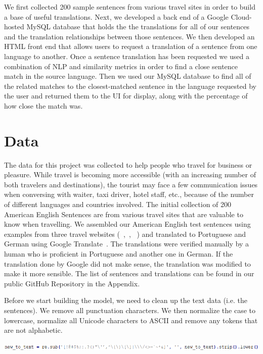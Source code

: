 \documentclass[runningheads]{llncs}
\begin{document}
	
	We first collected 200 sample sentences from various travel sites in order to build a base of useful translations. Next, we developed a back end of a Google Cloud-hosted MySQL database that holds the the translations for all of our sentences and the translation relationships between those sentences. We then developed an HTML front end that allows users to request a translation of a sentence from one language to another. Once a sentence translation has been requested we used a combination of NLP and similarity metrics in order to find a close sentence match in the source language. Then we used our MySQL database to find all of the related matches to the closest-matched sentence in the language requested by the user and returned them to the UI for display, along with the percentage of how close the match was. 

	\section{Data}
	The data for this project was collected to help people who travel for business or pleasure.  While travel is becoming more accessible (with an increasing number of both travelers and destinations), the tourist may face a few communication issues when conversing with waiter, taxi driver, hotel staff, etc., because of the number of different languages and countries involved. The initial collection of 200 American English Sentences are from various travel sites that are valuable to know when travelling. We assembled our American English test sentences using examples from three travel websites (~\cite{ref_url9},~\cite{ref_url4},~\cite{ref_url10} ) and translated to Portuguese and German using Google Translate~\cite{ref_url3}. The translations were verified manually by a human who is proficient in Portuguese and another one in German. If the translation done by Google did not make sense, the translation was modified to make it more sensible. The list of sentences and translations can be found in our public GitHub Repository in the Appendix.
	
	Before we start building the model, we need to clean up the text data (i.e. the sentences). We remove all punctuation characters. We then normalize the case to lowercase, normalize all Unicode characters to ASCII and remove any tokens that are not alphabetic. 
\newline

	\begin{minipage}{\linewidth}
		\begin{center}
			\hspace*{-.3in}
			\hspace*{-.3in}
			\includegraphics[width=\textwidth]{Text_Cleanup.png}
			\label{fig:Text Cleanup Code}
			\vspace*{1cm}
		\end{center}
	\end{minipage}
	\afterpage{\clearpage}
\end{document}
